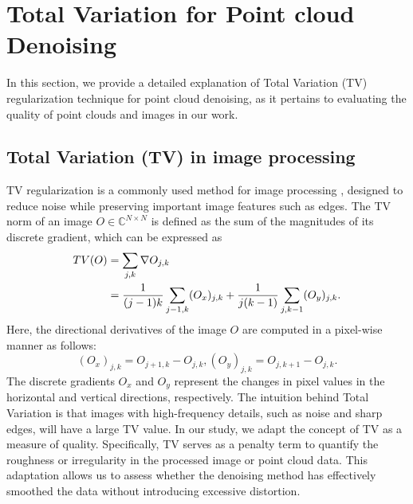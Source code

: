 \clearpage
\renewcommand\thesection{\Alph{section}}
\renewcommand\thesubsection{\thesection.\arabic{subsection}}
\setcounter{page}{1}
\setcounter{section}{0}
\maketitlesupplementary


\section{Total Variation for Point cloud Denoising}
\label{sec:TV}

In this section, we provide a detailed explanation of Total Variation (TV) regularization technique for point cloud denoising, as it pertains to evaluating the quality of point clouds and images in our work. 

\subsection{Total Variation (TV) in image processing}
TV regularization is a commonly used method for image processing \cite{RUDIN1992}, designed to reduce noise while preserving important image features such as edges. The TV norm of an image \( O \in \mathbb{C}^{N \times N} \) is defined as the sum of the magnitudes of its discrete gradient, which can be expressed as \cite{An2022EnhancedTV}
\begin{align}
TV(O) &= \sum_{j,k} \nabla O_{j,k} \notag \\
&= \frac{1}{(j-1)k} \sum_{j-1,k} (O_x)_{j,k} + \frac{1}{j(k-1)} \sum_{j,k-1}(O_y)_{j,k}.
\end{align}
Here, the directional derivatives of the image \( O \) are computed in a pixel-wise manner as follows:
\begin{equation} 
(O_x)_{j,k} = O_{j+1,k} - O_{j,k},
(O_y)_{j,k} = O_{j,k+1} - O_{j,k}.
\end{equation}
The discrete gradients \( O_x \) and \( O_y \) represent the changes in pixel values in the horizontal and vertical directions, respectively.
The intuition behind Total Variation is that images with high-frequency details, such as noise and sharp edges, will have a large TV value. In our study, we adapt the concept of TV as a measure of quality. Specifically, TV serves as a penalty term to quantify the roughness or irregularity in the processed image or point cloud data. This adaptation allows us to assess whether the denoising method has effectively smoothed the data without introducing excessive distortion.


